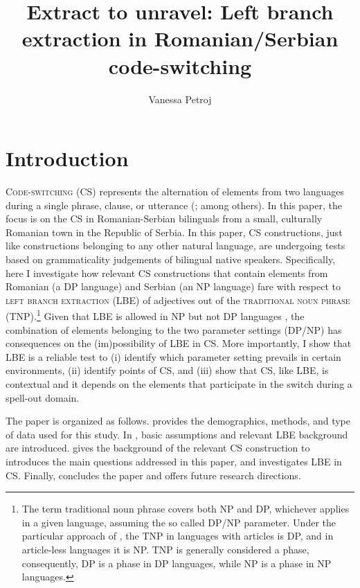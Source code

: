\documentclass[output=paper,
hidelinks,
newtxmath,
]{langscibook}
\title{Extract to unravel: Left branch extraction in Romanian/Serbian code-switching}
\author{%
 Vanessa Petroj\affiliation{University of Connecticut}
}
\begin{document}
\maketitle
{}

\section{Introduction}\label{s1}

\textsc{Code-switching} (CS) represents the alternation of elements from two languages during a single phrase, clause, or utterance (\citealt{Poplack1980,GonzalesVelasquez1995,MacSwan1999,Muysken2000}; among others). In this paper, the focus is on the CS in Romanian-Serbian bilinguals from a small, culturally Romanian town in the Republic of Serbia. In this paper, CS constructions, just like constructions belonging to any other natural language, are undergoing tests based on grammaticality judgements of bilingual native speakers. Specifically, here I investigate how relevant CS constructions that contain elements from Romanian (a DP language) and Serbian (an NP language) fare with respect to \textsc{left branch extraction} (LBE) of adjectives out of the \textsc{traditional noun phrase} (TNP).\footnote{\label{fn1}The term traditional noun phrase covers both NP and DP, whichever applies in a given language, assuming the so called DP/NP parameter. Under the particular approach of \citet{Boskovic2014}, the TNP in languages with articles is DP, and in article-less languages it is NP. TNP is generally considered a phase, consequently, DP is a phase in DP languages, while NP is a phase in NP languages.} Given that LBE is allowed in NP but not DP languages \citep{Uriagereka1988,Boskovic2008,Boskovic2012}, the combination of elements belonging to the two parameter settings (DP/NP) has consequences on the (im)possibility of LBE in CS. More importantly, I show that LBE is a reliable test to (i) identify which parameter setting prevails in certain environments, (ii) identify points of CS, and (iii) show that CS, like LBE, is contextual and it depends on the elements that participate in the switch during a spell-out domain.

The paper is organized as follows.  provides the demographics, methods, and type of data used for this study. In , basic assumptions and relevant LBE background are introduced.  gives the background of the relevant CS construction to introduces the main questions addressed in this paper, and  investigates LBE in CS. Finally,  concludes the paper and offers future research directions.
\end{document}
